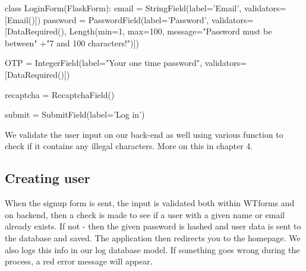 \begin{python}
class LoginForm(FlaskForm):
   email = StringField(label='Email', validators=[Email()])
   password = PasswordField(label='Password',
                            validators=[DataRequired(),
                            Length(min=1, max=100,
                            message="Password must be between"
                           +"7 and 100 characters!")])
   
   OTP = IntegerField(label="Your one time password",
                      validators=[DataRequired()])

   recaptcha = RecaptchaField()

   submit = SubmitField(label='Log in')
\end{python}

We validate the user input on our back-end as well using various function to check if it contains any illegal characters. More on this in chapter 4.  %

\subsection{Creating user}

When the signup form is sent, the input is validated both within WTforms and on backend, then a check is made to see if a user with a given name or email already exists. If not - then the given password is hashed and user data is sent to the database and saved. The application then redirects you to the homepage. We also logs this info in our log database model. If something goes wrong during the process, a red error message will appear.

